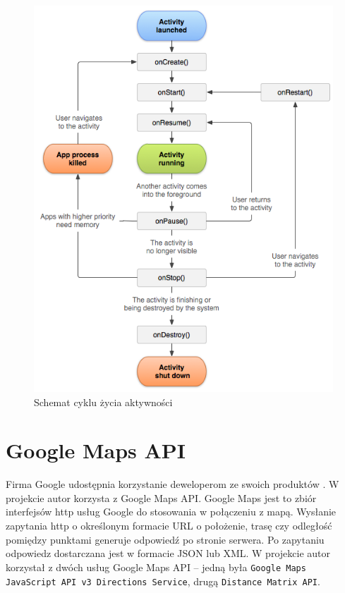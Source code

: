 \documentclass[eng,printmode,oneside]{mgr}
\begin{document}
\begin{figure}[ht!]
\centering
\includegraphics[width=80ex]{andActivityLifecycle.png}
\caption{Schemat cyklu życia aktywności\cite{developer.android}}
\label{fig:andActivityLifecycle}
\end{figure}

\section{Google Maps API}

Firma Google udostępnia korzystanie deweloperom ze swoich produktów
\cite{developer.google}. W projekcie autor korzysta z Google Maps API. Google
Maps jest to zbiór interfejsów http usług Google do stosowania w połączeniu z
mapą. Wysłanie zapytania http o określonym formacie URL o położenie, trasę czy
odległość pomiędzy punktami generuje odpowiedź po stronie serwera. Po zapytaniu
odpowiedz dostarczana jest w formacie JSON lub XML. W projekcie autor korzystał z dwóch
usług Google Maps API -- jedną była \texttt{Google Maps JavaScript API v3
Directions Service}, drugą \texttt{Distance Matrix API}.
\end{document}
